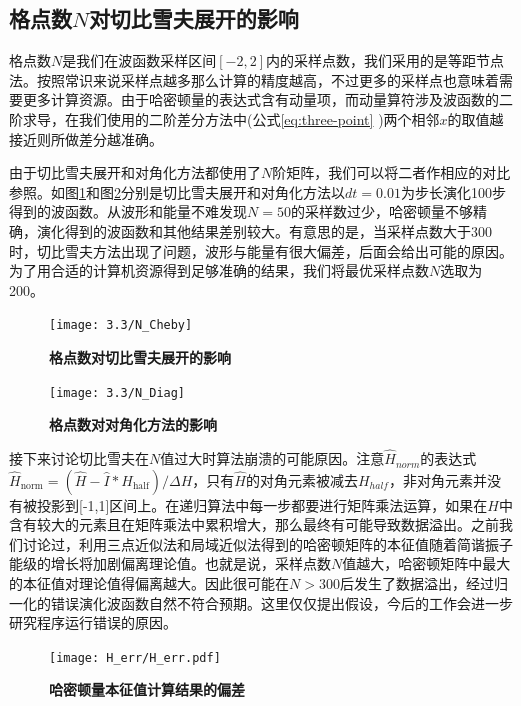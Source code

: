 \subsection{格点数$N$对切比雪夫展开的影响}
格点数$N$是我们在波函数采样区间$\left[-2,2\right]$内的采样点数，我们采用的是等距节点法。按照常识来说采样点越多那么计算的精度越高，不过更多的采样点也意味着需要更多计算资源。由于哈密顿量的表达式含有动量项，而动量算符涉及波函数的二阶求导，在我们使用的二阶差分方法中(公式\ref{eq:three-point} )两个相邻$x$的取值越接近则所做差分越准确。

由于切比雪夫展开和对角化方法都使用了$N$阶矩阵，我们可以将二者作相应的对比参照。如图\ref{fig:N_Cheby}和图\ref{fig:N_Diag}分别是切比雪夫展开和对角化方法以$dt=0.01$为步长演化100步得到的波函数。从波形和能量不难发现$N=50$的采样数过少，哈密顿量不够精确，演化得到的波函数和其他结果差别较大。有意思的是，当采样点数大于300时，切比雪夫方法出现了问题，波形与能量有很大偏差，后面会给出可能的原因。为了用合适的计算机资源得到足够准确的结果，我们将最优采样点数$N$选取为200。

\begin{figure}[h]
  \centering
  \captionsetup{justification=centering}
  \vspace{1mm}
  \texttt{[image: 3.3/N\_Cheby]}
  \caption{\textbf{格点数对切比雪夫展开的影响} \label{fig:N_Cheby}}
\end{figure}
\begin{figure}[h]
  \centering
  \captionsetup{justification=centering}
  \vspace{1mm}
  \texttt{[image: 3.3/N\_Diag]}
  \caption{\textbf{格点数对对角化方法的影响} \label{fig:N_Diag}}
\end{figure}

接下来讨论切比雪夫在$N$值过大时算法崩溃的可能原因。注意$\hat{H}_{norm}$的表达式$\hat{H}_{\text{norm}}  =  (\hat{H} - \hat{I}*H_{\text{half}}) / \Delta H$，只有$\hat{H}$的对角元素被减去$H_{half}$，非对角元素并没有被投影到[-1,1]区间上。在递归算法中每一步都要进行矩阵乘法运算，如果在$H$中含有较大的元素且在矩阵乘法中累积增大，那么最终有可能导致数据溢出。之前我们讨论过，利用三点近似法和局域近似法得到的哈密顿矩阵的本征值随着简谐振子能级的增长将加剧偏离理论值。也就是说，采样点数$N$值越大，哈密顿矩阵中最大的本征值对理论值得偏离越大。因此很可能在$N>300$后发生了数据溢出，经过归一化的错误演化波函数自然不符合预期。这里仅仅提出假设，今后的工作会进一步研究程序运行错误的原因。
\begin{figure}[hbt]
  \centering
  \captionsetup{justification=centering}
  \vspace{1mm}
  \texttt{[image: H\_err/H\_err.pdf]}
  \caption{\textbf{哈密顿量本征值计算结果的偏差} \label{fig:N_Hamiltonian}}
\end{figure}


